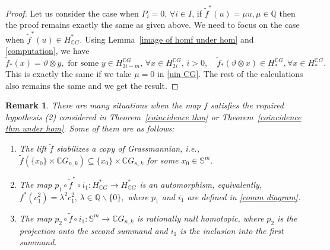 \documentclass{amsart}
\newtheorem{remark}[theorem]{Remark}
\newcommand{\thmref}[1]{Theorem~\ref{#1}}
\newcommand{\lemref}[1]{Lemma~\ref{#1}}
\begin{document}
\begin{proof}
	Let us consider the case when $P_i =0,\, \forall i \in I$, if $\tilde{f}^*(u) = \mu u, \mu \in \mathbb{Q}$ then the proof remains exactly the same as given above. We need to focus on the case when $\tilde{f}^*(u)\in H^*_{\mathbb{C}G}$. Using \lemref{image of homf under hom} and \eqref{computation}, we have $$\tilde{f}_*(x) = \vartheta \otimes y, \text{ for some }y\in H_{2i-m}^{\mathbb CG}, \, \forall x \in H_{2i}^{\mathbb{C}G}, \, i>0, \quad \tilde{f}_*(\vartheta \otimes x) \in H_*^{\mathbb{C}G}, \forall x\in  H_*^{\mathbb{C}G}.$$ This is exactly the same if we take $\mu =0$ in \eqref{uin CG}. The rest of the calculations also remains the same and we get the result.
\end{proof}



\begin{remark}
	There are many situations when the map $f$ satisfies the required %
hypothesis \textit{(2)} considered %
in \thmref{coincidence thm} or \thmref{coincidence thm under hom}. Some of them are as %
follows: 
	\begin{enumerate}
		\item The %
lift $\tilde f$ stabilizes a copy of Grassmannian, i.e., $\tilde f(\{x_0\}\times\mathbb CG_{n,k})\subseteq \{x_0\}\times\mathbb CG_{n,k}$ for some $x_0\in \mathbb S^m$. 
		\item  The map $p_1\circ \tilde f^*\circ i_1: H^*_{\mathbb CG}\to H^*_{\mathbb C G}$ is an automorphism, equivalently, $f^*(c_1^2)=\lambda^2c_1^2,\, \lambda\in \mathbb Q\backslash \{0\},$ where $p_1$ and $i_1$ are defined in \eqref{comm diagram}.
		\item The map $p_2\circ \tilde f\circ i_1:\mathbb S^m\to \mathbb CG_{n,k}$ is rationally null homotopic, where $p_2$ is the projection onto the second summand and $i_1$ is the inclusion into the first summand. %
	\end{enumerate} 
\end{remark}
\end{document}
